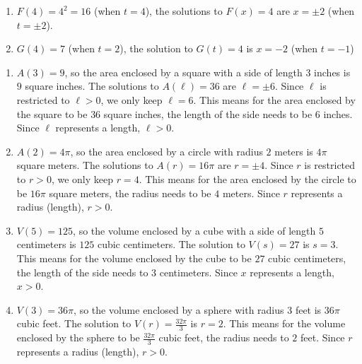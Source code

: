 \documentclass{ximera}
\begin{document}
\begin{enumerate}
\begin{enumerate}
\begin{image}
\begin{tikzpicture}[font=\LARGE]
\end{tikzpicture}
\end{image}


\end{enumerate}


\item  $F(4) = 4^2 = 16$ (when $t = 4$), the solutions to $F(x) = 4$ are $x = \pm 2$ (when $t = \pm 2$). 

\item  $G(4) = 7$ (when $t = 2$), the solution to $G(t) = 4$ is $x = -2$ (when $t = -1$)



\end{enumerate}


\begin{enumerate}

\item  $A(3) = 9$, so the area enclosed by a square with a side of length $3$ inches is $9$ square inches.  The solutions to $A(\ell) = 36$ are $\ell = \pm 6$.  Since $\ell$ is restricted to  $\ell > 0$, we only keep $\ell  = 6$.  This means for the area enclosed by the square to be $36$ square inches, the length of the side needs to be $6$ inches.  Since $\ell$ represents a length, $\ell > 0$.



\item  $A(2) = 4\pi$, so the area enclosed by a circle with radius $2$ meters is $4\pi$ square meters.  The solutions to $A(r) = 16\pi$ are $r = \pm 4$.  Since $r$ is restricted to $r > 0$, we only keep $r = 4$.  This means for the area enclosed by the circle to be $16\pi$ square meters, the radius needs to be $4$ meters.  Since $r$ represents a radius (length), $r > 0$.

\item  $V(5) = 125$, so the volume enclosed by a cube with a side of length $5$ centimeters is $125$ cubic centimeters.  The solution to $V(s) = 27$ is $s = 3$.  This means for the volume enclosed by the cube to be $27$ cubic centimeters, the length of the side needs to $3$ centimeters.  Since $x$ represents a length, $x > 0$.

\item  $V(3) = 36\pi$, so the volume enclosed by a sphere with radius $3$ feet is $36\pi$ cubic feet.  The solution to $V(r) = \frac{32\pi}{3}$ is $r = 2$.  This means for the volume enclosed by the sphere to be $\frac{32\pi}{3}$ cubic feet, the radius needs to $2$ feet.  Since $r$ represents a radius (length), $r > 0$.



\end{enumerate}
\end{document}
